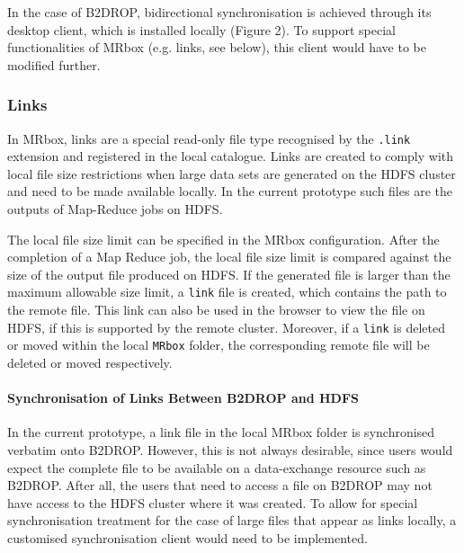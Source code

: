 In the case of B2DROP, bidirectional synchronisation is achieved through its desktop client, which is installed locally (Figure 2). To support special functionalities of MRbox (e.g. links, see below), this client would have to be modified further.

\subsubsection{Links}
\label{sec:links}
In MRbox, links are a special read-only file type recognised by the \texttt{.link} extension and registered in the local catalogue. Links are created to comply with local file size restrictions when large data sets are generated on the HDFS cluster and need to be made available locally. In the current prototype such files are the outputs of Map-Reduce jobs on HDFS.

The local file size limit can be specified in the MRbox configuration. After the completion of a Map Reduce job, the local file size limit is compared against  the size of the output file produced on HDFS. If the generated file is larger than the maximum allowable size limit, a \texttt{link} file is created, which contains the path to the remote file. This link can also be used in the browser to view the file on HDFS, if this is supported by the remote cluster. Moreover, if a \texttt{link} is deleted or moved within the local \texttt{MRbox} folder, the corresponding remote file will be deleted or moved respectively.

\paragraph{Synchronisation of Links Between B2DROP and HDFS}
In the current prototype, a link file in the local MRbox folder is synchronised verbatim onto B2DROP. However, this is not always desirable, since users would expect the complete file to be available on a data-exchange resource such as B2DROP. After all, the users that need to access a file on B2DROP may not have access to the HDFS cluster where it was created. To allow for special synchronisation treatment for the case of large files that appear as links locally, a customised synchronisation client would need to be implemented.

